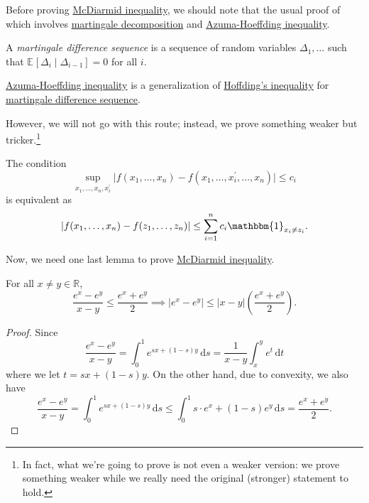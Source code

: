 Before proving \hyperref[thm:McDiarmid-inequality]{McDiarmid inequality}, we should note that the usual proof of which involves \href{https://en.wikipedia.org/wiki/Doob_decomposition_theorem}{martingale decomposition} and \href{https://en.wikipedia.org/wiki/Azuma%27s_inequality}{Azuma-Hoeffding inequality}.

\begin{definition}\label{def:martingale-difference-sequence}
	A \emph{martingale difference sequence} is a sequence of random variables \(\Delta _1, \dots \) such that \(\mathbb{E}_{}\left[\Delta _i \mid \Delta _{i-1} \right] = 0\) for all \(i\).
\end{definition}

\begin{note}
	\href{https://en.wikipedia.org/wiki/Azuma%27s_inequality}{Azuma-Hoeffding inequality} is a generalization of \hyperref[thm:Hoeffding-inequality]{Hoffding's inequality} for \hyperref[def:martingale-difference-sequence]{martingale difference sequence}. 
\end{note}

However, we will not go with this route; instead, we prove something weaker but tricker.\footnote{In fact, what we're going to prove is not even a weaker version: we prove something weaker while we really need the original (stronger) statement to hold.}

\begin{note}
	The condition
	\[
		\sup _{x_1, \dots , x_n, x_i^{\prime} }\vert f(x_1, \dots , x_n) - f(x_1, \dots , x_i^{\prime} , \dots , x_n) \vert \leq c_i
	\]
	is equivalent as
	\[
		\vert f(x_1, \dots , x_n) - f(z_1, \dots , z_n) \vert \leq \sum_{i=1}^{n} c_i \mathbbm{1}_{x_i \neq z_i}.
	\]
\end{note}

Now, we need one last lemma to prove \hyperref[thm:McDiarmid-inequality]{McDiarmid inequality}.

\begin{lemma}\label{lma:lec5}
	For all \(x \neq y \in \mathbb{R} \),
	\[
		\frac{e^x - e^y}{x-y} \leq \frac{e^x + e^y}{2} \implies \vert e^x - e^y \vert \leq \vert x - y \vert \left( \frac{e^x + e^y}{2} \right).
	\]
\end{lemma}
\begin{proof}
	Since
	\[
		\frac{e^x - e^y}{x-y}
		= \int_{0}^{1} e^{s x + (1 - s)y} \,\mathrm{d}s
		= \frac{1}{x - y} \int_{x}^{y} e^t \,\mathrm{d}t
	\]
	where we let \(t = sx + (1 - s)y\). On the other hand, due to convexity, we also have
	\[
		\frac{e^x - e^y}{x-y}
		= \int_{0}^{1} e^{s x + (1 - s)y} \,\mathrm{d}s
		\leq \int_{0}^{1} s\cdot e^x + (1 - s)e^y \,\mathrm{d}s
		= \frac{e^x + e^y}{2}.
	\]
\end{proof}

